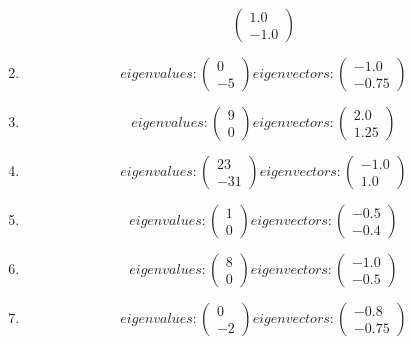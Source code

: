 \documentclass{article}%
\begin{document}
\begin{enumerate}[label=\arabic*)]
\[\begin{pmatrix}
1.0\\%
-1.0%
\end{pmatrix}%
\]%
\item%
\[%
eigenvalues: \begin{pmatrix}%
0\\%
-5%
\end{pmatrix} eigenvectors: \begin{pmatrix}%
-1.0\\%
-0.75%
\end{pmatrix}%
\]%
\item%
\[%
eigenvalues: \begin{pmatrix}%
9\\%
0%
\end{pmatrix} eigenvectors: \begin{pmatrix}%
2.0\\%
1.25%
\end{pmatrix}%
\]%
\item%
\[%
eigenvalues: \begin{pmatrix}%
23\\%
-31%
\end{pmatrix} eigenvectors: \begin{pmatrix}%
-1.0\\%
1.0%
\end{pmatrix}%
\]%
\item%
\[%
eigenvalues: \begin{pmatrix}%
1\\%
0%
\end{pmatrix} eigenvectors: \begin{pmatrix}%
-0.5\\%
-0.4%
\end{pmatrix}%
\]%
\item%
\[%
eigenvalues: \begin{pmatrix}%
8\\%
0%
\end{pmatrix} eigenvectors: \begin{pmatrix}%
-1.0\\%
-0.5%
\end{pmatrix}%
\]%
\item%
\[%
eigenvalues: \begin{pmatrix}%
0\\%
-2%
\end{pmatrix} eigenvectors: \begin{pmatrix}%
-0.8\\%
-0.75%
\end{pmatrix}%
\]%
\end{enumerate}

%
\end{document}
